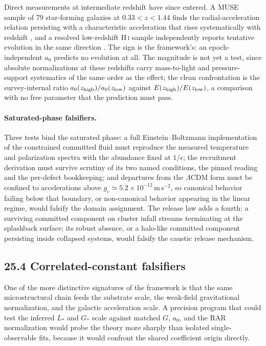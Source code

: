 \documentclass[11pt]{article}
\begin{document}
Direct measurements at intermediate redshift have since entered. A MUSE sample of $79$ star-forming galaxies at $0.33<z<1.44$ finds the radial-acceleration relation persisting with a characteristic acceleration that rises systematically with redshift \citep{Ciocan2026}, and a resolved low-redshift H\,\textsc{i} sample independently reports tentative evolution in the same direction \citep{Varasteanu2025}. The sign is the framework's: an epoch-independent $a_0$ predicts no evolution at all. The magnitude is not yet a test, since absolute normalizations at these redshifts carry mass-to-light and pressure-support systematics of the same order as the effect; the clean confrontation is the survey-internal ratio $a_0(z_{\rm high})/a_0(z_{\rm low})$ against $E(z_{\rm high})/E(z_{\rm low})$, a comparison with no free parameter that the prediction must pass.



\paragraph{Saturated-phase falsifiers.}
Three tests bind the saturated phase: a full Einstein--Boltzmann implementation of the constrained committed fluid must reproduce the measured temperature and polarization spectra with the abundance fixed at $1/\epsilon$; the recruitment derivation must survive scrutiny of its two named conditions, the pinned reading and the per-defect bookkeeping; and departures from the $\Lambda$CDM form must be confined to accelerations above $g_c\simeq5.2\times10^{-12}\,\mathrm{m\,s^{-2}}$, so canonical behavior failing below that boundary, or non-canonical behavior appearing in the linear regime, would falsify the domain assignment. The release law adds a fourth: a surviving committed component on cluster infall streams terminating at the splashback surface; its robust absence, or a halo-like committed component persisting inside collapsed systems, would falsify the caustic release mechanism.

\subsection{25.4 Correlated-constant falsifiers}

One of the more distinctive signatures of the framework is that the same microstructural chain feeds the substrate scale, the weak-field gravitational normalization, and the galactic acceleration scale. A precision program that could test the inferred $L_*$ and $G_*$ scale against matched $G$, $a_0$, and the RAR normalization would probe the theory more sharply than isolated single-observable fits, because it would confront the shared coefficient origin directly.
\end{document}
